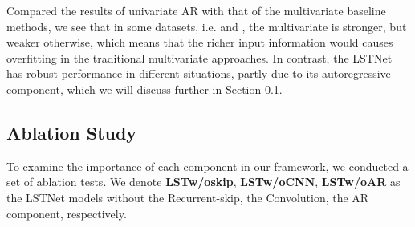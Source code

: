 
Compared the results of univariate AR with that of the multivariate baseline methods, we see that in some datasets, i.e. \solar and \traffic, the multivariate is stronger, but weaker otherwise, which means that the richer input information would causes overfitting in the traditional multivariate approaches. In contrast, the LSTNet has robust performance in different situations, partly due to its  autoregressive component, which we will discuss further in Section \ref{sec:ablation}.





\subsection{Ablation Study}
\label{sec:ablation}
To examine the importance of each component in our framework, we conducted a set of ablation tests.  We denote \textbf{LSTw/oskip}, \textbf{LSTw/oCNN}, \textbf{LSTw/oAR} as the LSTNet models without the Recurrent-skip, the Convolution, the AR component, respectively. 

